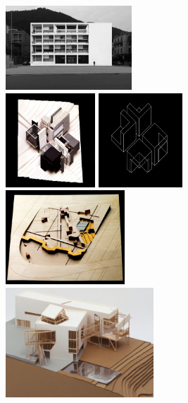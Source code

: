 \begin{figure}
\vspace{-1em}
\includegraphics[height=8.5em]{chapters/fig/grammar-fascio.jpg}\quad
{}\\[1em]
\includegraphics[height=9.5em]{chapters/fig/grammar-house-x-model.jpg}\quad
\includegraphics[height=9.5em]{chapters/fig/grammar-house-x-diagram.jpg}\quad
\includegraphics[height=9.5em]{chapters/fig/grammar-la-vilette.jpg}\\[1em]
\includegraphics[height=11.1em]{chapters/fig/grammar-familian.jpg}\quad

\end{figure}
